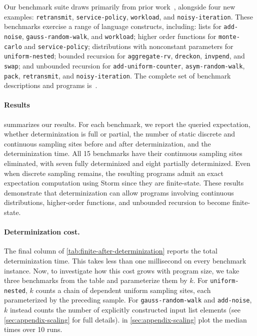 Our benchmark suite draws primarily from prior work~\cite{chakarov2013martingales,chakarov2014expectation,beutner2022guaranteed,barthe2016private,vakar2019domain,sato2019formal,gehr2016psi}, alongside four new examples: \texttt{retransmit}, \texttt{service-policy}, \texttt{workload}, and \texttt{noisy-iteration}. 
These benchmarks exercise a range of language constructs, including: lists for \texttt{add-noise},
\texttt{gauss-random-walk}, and \texttt{workload}; higher order functions for \texttt{monte-carlo} and \texttt{service-policy}; distributions with nonconstant parameters for \texttt{uniform-nested}; bounded recursion for \texttt{aggregate-rv}, \texttt{dreckon}, \texttt{invpend},
and \texttt{swap}; and unbounded recursion for \texttt{add-uniform-counter}, \texttt{asym-random-walk},
\texttt{pack}, \texttt{retransmit}, and \texttt{noisy-iteration}. The complete set of benchmark descriptions and programs is~.



\paragraph{Results}  summarizes our results. For each benchmark, we report the queried expectation, whether determinization is full or partial, the number of static discrete and continuous sampling sites before and after determinization, and the determinization time. All 15 benchmarks have their continuous sampling sites eliminated, with seven fully determinized and eight partially determinized. Even when discrete sampling remains, the resulting programs admit an exact expectation computation using Storm since they are finite-state. These results demonstrate that determinization can allow programs involving continuous distributions, higher-order functions, and unbounded recursion to become finite-state.

\paragraph{Determinization cost.}
The final column of \cref{tab:finite-after-determinization}
reports the total determinization time. This takes less than one millisecond on every benchmark instance. Now, to investigate how this cost grows with program size, we
take three benchmarks from the table and parameterize them by $k$. For \texttt{uniform-nested}, $k$ counts a chain of dependent uniform sampling sites, each parameterized by the preceding sample. For \texttt{gauss-random-walk} and \texttt{add-noise}, $k$ instead counts the number of explicitly constructed input list elements (see \cref{sec:appendix-scaling} for full details).  in \cref{sec:appendix-scaling} plot the median times over 10 runs.



